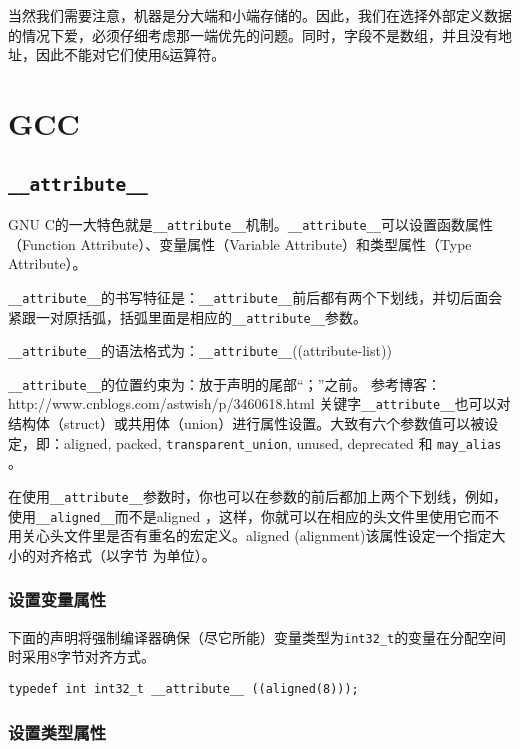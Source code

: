 			当然我们需要注意，机器是分大端和小端存储的。因此，我们在选择外部定义数据的情况下爱，必须仔细考虑那一端优先的问题。同时，字段不是数组，并且没有地址，因此不能对它们使用\texttt{&}运算符。	
\section{GCC}
	\subsection{\texttt{__attribute__}}
		GNU C的一大特色就是\texttt{__attribute__}机制。\texttt{__attribute__}可以设置函数属性（Function Attribute）、变量属性（Variable Attribute）和类型属性（Type Attribute）。

		\texttt{__attribute__}的书写特征是：\texttt{__attribute__}前后都有两个下划线，并切后面会紧跟一对原括弧，括弧里面是相应的\texttt{__attribute__}参数。

		\texttt{__attribute__}的语法格式为：\texttt{__attribute__}((attribute-list))

		\texttt{__attribute__}的位置约束为：放于声明的尾部“；”之前。
		参考博客：http://www.cnblogs.com/astwish/p/3460618.html
		关键字\texttt{__attribute__}也可以对结构体（struct）或共用体（union）进行属性设置。大致有六个参数值可以被设定，即：aligned, packed, \texttt{transparent_union}, unused, deprecated 和 \texttt{may_alias} 。

		在使用\texttt{__attribute__}参数时，你也可以在参数的前后都加上两个下划线，例如，使用\texttt{__aligned__}而不是aligned ，这样，你就可以在相应的头文件里使用它而不用关心头文件里是否有重名的宏定义。aligned (alignment)该属性设定一个指定大小的对齐格式（以字节 为单位）。		

			\subsubsection{设置变量属性}
				下面的声明将强制编译器确保（尽它所能）变量类型为\texttt{int32_t}的变量在分配空间时采用8字节对齐方式。

\begin{verbatim}
typedef int int32_t __attribute__ ((aligned(8)));
\end{verbatim}
			\subsubsection{设置类型属性}

